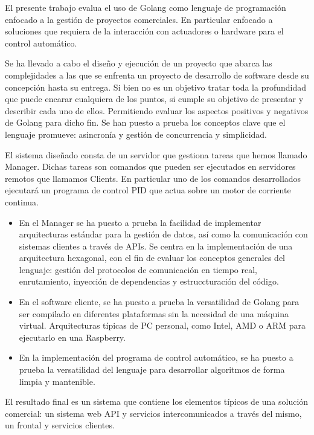 
El presente trabajo evalua el uso de Golang como lenguaje de programación enfocado a la gestión de proyectos comerciales. En particular enfocado a soluciones que requiera de la interacción con actuadores o hardware para el control automático.

Se ha llevado a cabo el diseño y ejecución de un proyecto que abarca las complejidades a las que se enfrenta un proyecto de desarrollo de software desde su concepción hasta su entrega. Si bien no es un objetivo tratar toda la profundidad que puede encarar cualquiera de los puntos, si cumple su objetivo de presentar y describir cada uno de ellos. Permitiendo evaluar los aspectos positivos y negativos de Golang para dicho fin. Se han puesto a prueba los conceptos clave que el lenguaje promueve: asincronía y gestión de concurrencia y simplicidad.

El sistema diseñado consta de un servidor que gestiona tareas que hemos llamado Manager. Dichas tareas son comandos que pueden ser ejecutados en servidores remotos que llamamos Clients. En particular uno de los comandos desarrollados ejecutará un programa de control PID que actua sobre un motor de corriente continua.

\begin{itemize}
    \item En el Manager se ha puesto a prueba la facilidad de implementar arquitecturas estándar para la gestión de datos, así como la comunicación con sistemas clientes a través de APIs. Se centra en la implementación de una arquitectura hexagonal, con el fin de evaluar los conceptos generales del lenguaje: gestión del protocolos de comunicación en tiempo real, enrutamiento, inyección de dependencias y estruccturación del código.
    \item En el software cliente, se ha puesto a prueba la versatilidad de Golang para ser compilado en diferentes plataformas sin la necesidad de una máquina virtual. Arquitecturas típicas de PC personal, como Intel, AMD o ARM para ejecutarlo en una Raspberry.
    \item  En la implementación del programa de control automático, se ha puesto a prueba la versatilidad del lenguaje para desarrollar algoritmos de forma limpia y mantenible.
\end{itemize}

El resultado final es un sistema que contiene los elementos típicos de una solución comercial: un sistema web API y servicios intercomunicados a través del mismo, un frontal y servicios clientes.